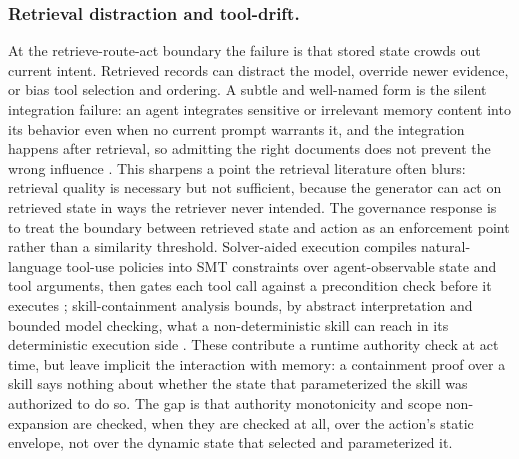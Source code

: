 \subsubsection{Retrieval distraction and tool-drift.}
At the retrieve-route-act boundary the failure is that stored state crowds out current intent. Retrieved records can distract the model, override newer evidence, or bias tool selection and ordering. A subtle and well-named form is the silent integration failure: an agent integrates sensitive or irrelevant memory content into its behavior even when no current prompt warrants it, and the integration happens after retrieval, so admitting the right documents does not prevent the wrong influence \citep{xu2026memorysilent}. This sharpens a point the retrieval literature often blurs: retrieval quality is necessary but not sufficient, because the generator can act on retrieved state in ways the retriever never intended. The governance response is to treat the boundary between retrieved state and action as an enforcement point rather than a similarity threshold. Solver-aided execution compiles natural-language tool-use policies into SMT constraints over agent-observable state and tool arguments, then gates each tool call against a precondition check before it executes \citep{winston2026solveraided}; skill-containment analysis bounds, by abstract interpretation and bounded model checking, what a non-deterministic skill can reach in its deterministic execution side \citep{metere2026skillcontainment}. These contribute a runtime authority check at act time, but leave implicit the interaction with memory: a containment proof over a skill says nothing about whether the state that parameterized the skill was authorized to do so. The gap is that authority monotonicity and scope non-expansion are checked, when they are checked at all, over the action's static envelope, not over the dynamic state that selected and parameterized it.

